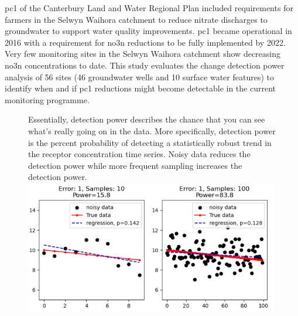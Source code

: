 \glsresetall  %

\gls{pc1} of the Canterbury Land and Water Regional Plan included requirements for farmers in the Selwyn Waihora catchment to reduce nitrate discharges to groundwater to support water quality improvements.
\gls{pc1} became operational in 2016 with a requirement for \gls{no3n} reductions to be fully implemented by 2022.
Very few monitoring sites in the Selwyn Waihora catchment show decreasing \gls{no3n} concentrations to date.
This study evaluates the change detection power analysis of 56 sites (46 groundwater wells and 10 surface water features) to identify when and if \gls{pc1} reductions might become detectable in the current monitoring programme.

\begin{figure}
    \begin{breakawaybox}[title=What is Detection Power]{}

        Essentially, detection power describes the chance that you can see what's really going on in the data.
        More specifically, detection power is the percent probability of detecting a statistically robust trend in the receptor concentration time series.
        Noisy data reduces the detection power while more frequent sampling increases the detection power.
        \\
        \includegraphics[width=0.99\textwidth]{figures/dp_ex_small}
    \end{breakawaybox}
\end{figure}

